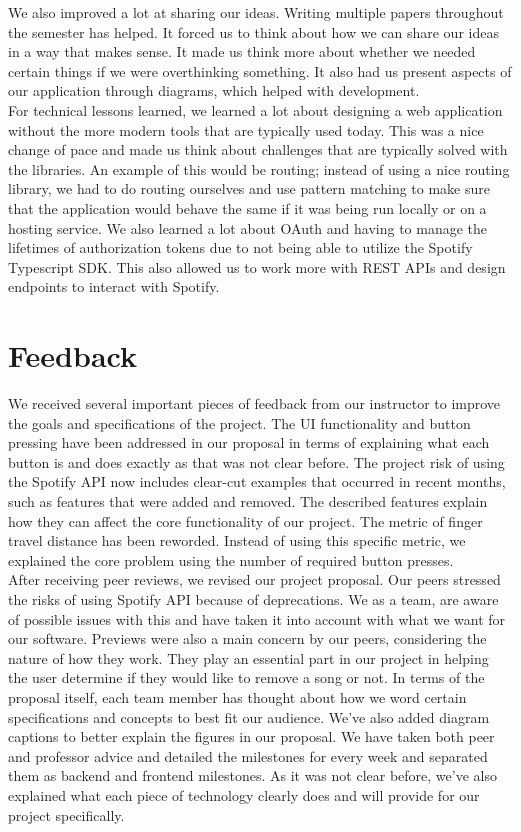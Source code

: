 \documentclass{article}
\begin{document}
We also improved a lot at sharing our ideas. Writing multiple papers throughout the semester has helped. It forced us to think about how we can share our ideas in a way that makes sense. It made us think more about whether we needed certain things if we were overthinking something. It also had us present aspects of our application through diagrams, which helped with development. \\

For technical lessons learned, we learned a lot about designing a web application without the more modern tools that are typically used today. This was a nice change of pace and made us think about challenges that are typically solved with the libraries. An example of this would be routing; instead of using a nice routing library, we had to do routing ourselves and use pattern matching to make sure that the application would behave the same if it was being run locally or on a hosting service. We also learned a lot about OAuth and having to manage the lifetimes of authorization tokens due to not being able to utilize the Spotify Typescript SDK. This also allowed us to work more with REST APIs and design endpoints to interact with Spotify.

\section{Feedback}
\quad We received several important pieces of feedback from our instructor to improve the goals and specifications of the project. The UI functionality and button pressing have been addressed in our proposal in terms of explaining what each button is and does exactly as that was not clear before. The project risk of using the Spotify API now includes clear-cut examples that occurred in recent months, such as features that were added and removed. The described features explain how they can affect the core functionality of our project. The metric of finger travel distance has been reworded. Instead of using this specific metric, we explained the core problem using the number of required button presses. \\

After receiving peer reviews, we revised our project proposal. Our peers stressed the risks of using Spotify API because of deprecations. We as a team, are aware of possible issues with this and have taken it into account with what we want for our software. Previews were also a main concern by our peers, considering the nature of how they work. They play an essential part in our project in helping the user determine if they would like to remove a song or not. In terms of the proposal itself, each team member has thought about how we word certain specifications and concepts to best fit our audience. We've also added diagram captions to better explain the figures in our proposal. We have taken both peer and professor advice and detailed the milestones for every week and separated them as backend and frontend milestones. As it was not clear before, we've also explained what each piece of technology clearly does and will provide for our project specifically.
\end{document}
